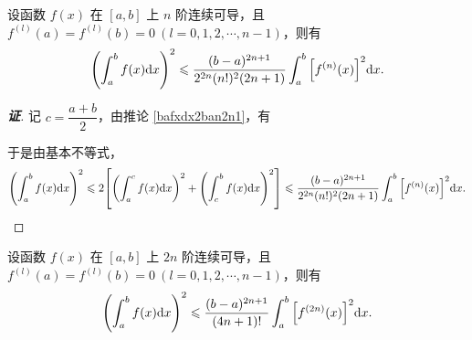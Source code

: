 \begin{inference}
    设函数 $f(x)$ 在 $[a,b]$ 上 $n$ 阶连续可导，且 $f^{(l)}(a)=f^{(l)}(b)=0~ (l=0,1,2,\cdots,n-1)$，则有
    $$\qty(\int_{a}^{b}f(x)\dd x)^2\leqslant \dfrac{(b-a)^{2n+1}}{2^{2n}(n!)^2(2n+1)}\int_{a}^{b}\qty[f^{(n)}(x)]^2\dd x.$$
\end{inference}
\begin{proof}[{\songti \textbf{证}}]
    记 $c=\dfrac{a+b}{2}$，由推论 \ref{bafxdx2ban2n1}，有
    于是由基本不等式，
    $$\qty(\int_{a}^{b}f(x)\dd x)^2\leqslant 2\qty[\qty(\int_{a}^{c}f(x)\dd x)^2+\qty(\int_{c}^{b}f(x)\dd x)^2]\leqslant \dfrac{(b-a)^{2n+1}}{2^{2n}(n!)^2(2n+1)}\int_{a}^{b}\qty[f^{(n)}(x)]^2\dd x.$$
\end{proof}

\begin{inference}
    设函数 $f(x)$ 在 $[a,b]$ 上 $2n$ 阶连续可导，且 $f^{(l)}(a)=f^{(l)}(b)=0~ (l=0,1,2,\cdots,n-1)$，则有
    $$\qty(\int_{a}^{b}f(x)\dd x)^2\leqslant\dfrac{(b-a)^{2n+1}}{(4n+1)!}\int_{a}^{b}\qty[f^{(2n)}(x)]^2\dd x.$$
\end{inference}

